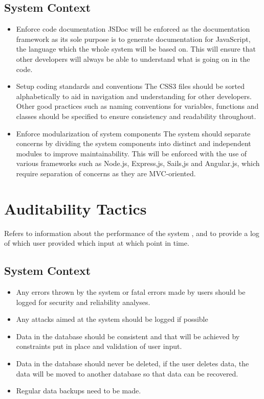 \documentclass[11pt,fleqn]{book} %
\begin{document}
	\subsection{System Context}
	\begin{itemize}
		\item Enforce code documentation\newline\newline
		JSDoc will be enforced as the documentation framework as its sole purpose is to generate documentation for JavaScript, the language which the whole system will be based on. This will ensure that other developers will always be able to understand what is going on in the code.\newline
		
		\item Setup coding standards and conventions\newline\newline
		The CSS3 files should be sorted alphabetically to aid in navigation and understanding for other developers. Other good practices such as naming conventions for variables, functions and classes should be specified to ensure consistency and readability throughout.\newline
		
		\item Enforce modularization of system components\newline\newline
		The system should separate concerns by dividing the system components into distinct and independent modules to improve maintainability. This will be enforced with the use of various frameworks such as Node.js, Express,js, Sails,js and Angular.js, which require separation of concerns as they are MVC-oriented.
		
	\end{itemize}
	
	\section{Auditability Tactics}
	Refers to information about the performance of the system , and to provide a log of which user provided which input at which point in time.
	\subsection{System Context}
	\begin{itemize}
		\item Any errors thrown by the system or fatal errors made by users should be logged for security and reliability analyses.
		\item Any attacks aimed at the system should be logged if possible
		\item Data in the database should be consistent and that will be achieved by constraints put in place and validation of user input.
		\item Data in the database should never be deleted, if the user deletes data, the data will be moved to another database so that data can be recovered.
		\item Regular data backups need to be made.
	\end{itemize}
\end{document}
